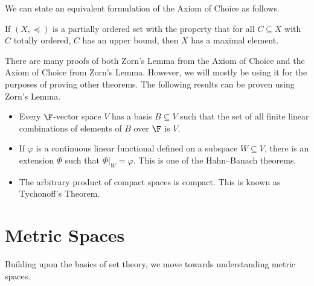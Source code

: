 We can state an equivalent formulation of the Axiom of Choice as follows.
\begin{theorem}
  If $\left(X,\preceq\right)$ is a partially ordered set with the property that for all $C\subseteq X$ with $C$ totally ordered, $C$ has an upper bound, then $X$ has a maximal element.
\end{theorem}
There are many proofs of both Zorn's Lemma from the Axiom of Choice and the Axiom of Choice from Zorn's Lemma. However, we will mostly be using it for the purposes of proving other theorems. The following results can be proven using Zorn's Lemma.
\begin{example}
  \begin{itemize}
    \item Every $\F$-vector space $V$ has a basis $B\subseteq V$ such that the set of all finite linear combinations of elements of $B$ over $\F$ is $V$.
    \item If $\varphi$ is a continuous linear functional defined on a subspace $W\subseteq V$, there is an extension $\Phi$ such that $\Phi|_{W} = \varphi$. This is one of the Hahn--Banach theorems. %
    \item The arbitrary product of compact spaces is compact. This is known as Tychonoff's Theorem. %
  \end{itemize}
\end{example}
\section{Metric Spaces}%
Building upon the basics of set theory, we move towards understanding metric spaces.
